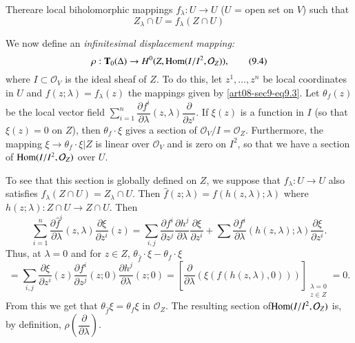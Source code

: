 There\pageoriginale are local biholomorphic mappings $f_{\lambda}:U\to U$ ($U$ = open set on $V$) such that 
\begin{equation*}
Z_{\lambda}\cap U=f_{\lambda}(Z\cap U)\tag{9.3}\label{art08-sec9-eq9.3}
\end{equation*}

We now define an {\em infinitesimal displacement mapping:}
\begin{equation*}
\rho : \mathbf{T}_{0}(\Delta)\to H^{0}(Z,\operatorname{\mathrm{Hom}}(I/I^{2},\mathcal{O}_{Z})),\tag{9.4}\label{art08-sec9-eq9.4}
\end{equation*}
where $I\subset \mathcal{O}_{V}$ is the ideal sheaf of $Z$. To do this, let $z^{1},\ldots,z^{n}$ be local coordinates in $U$ and $f(z;\lambda)=f_{\lambda}(z)$ the mappings given by \eqref{art08-sec9-eq9.3}. Let $\theta_{f}(z)$ be the local vector field $\sum\limits^{n}_{i=1}\dfrac{\partial f^{i}}{\partial \lambda}(z,\lambda)\dfrac{\partial}{\partial z^{i}}$. If $\xi(z)$ is a function in $I$ (so that $\xi(z)=0$ on $Z$), then $\theta_{f}\cdot \xi$ gives a section of $\mathcal{O}_{V}/I=\mathcal{O}_{Z}$. Furthermore, the mapping $\xi\to \theta_{f}\cdot \xi|Z$ is linear over $\mathcal{O}_{V}$ and is zero on $I^{2}$, so that we have a section of $\operatorname{\mathrm{Hom}}(I/I^{2},\mathcal{O}_{Z})$ over $U$.

To see that this section is globally defined on $Z$, we suppose that $\widehat{f}_{\lambda}:U\to U$ also satisfies $\widehat{f}_{\lambda}(Z\cap U)=Z_{\lambda}\cap U$. Then $\widehat{f}(z;\lambda)=f(h(z,\lambda);\lambda)$ where $h(z;\lambda):Z\cap U\to Z\cap U$. Then
$$
\sum\limits^{n}_{i=1}\dfrac{\partial \widehat{f}^{i}}{\partial\lambda}(z,\lambda)\dfrac{\partial\xi}{\partial z^{i}}(z)=\sum\limits_{i,j}\dfrac{\partial f^{i}}{\partial z^{j}}\dfrac{\partial h^{j}}{\partial\lambda}\dfrac{\partial \xi}{\partial z^{i}}+\sum \dfrac{\partial f^{i}}{\partial \lambda}(h(z,\lambda);\lambda)\dfrac{\partial \xi}{\partial z^{i}}.
$$
Thus, at $\lambda=0$ and for $z\in Z$, $\theta_{\widehat{f}}\cdot \xi-\theta_{f}\cdot \xi$
$$
=\sum\limits_{i,j}\dfrac{\partial \xi}{\partial z^{i}}(z)\dfrac{\partial f^{i}}{\partial z^{j}}(z;0)\dfrac{\partial h^{j}}{\partial \lambda}(z;0)=\left[\dfrac{\partial}{\partial\lambda}(\xi(f(h(z,\lambda),0)))\right]_{\substack{\lambda=0\\ z\in Z}}=0.
$$
From this we get that $\theta_{\widehat{f}}\xi=\theta_{f}\xi$ in $\mathcal{O}_{Z}$. The resulting section of\break $\operatorname{\mathrm{Hom}}(I/I^{2},\mathcal{O}_{Z})$ is, by definition, $\rho\left(\dfrac{\partial}{\partial\lambda}\right)$.


